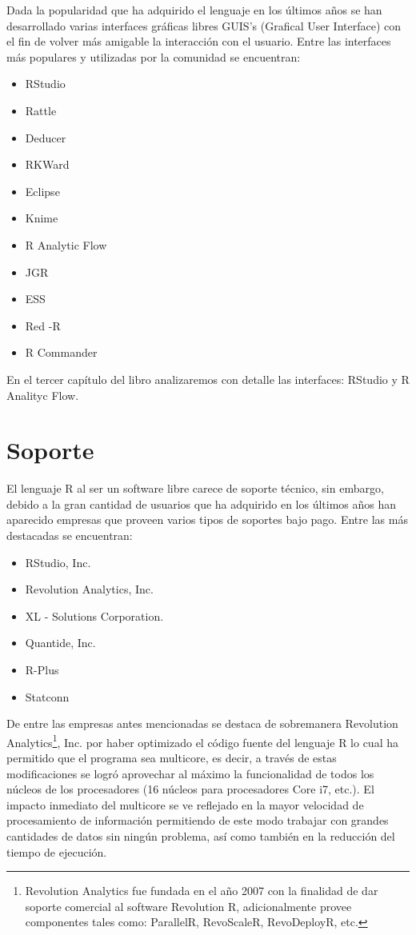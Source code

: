 \documentclass[11pt,a4paper,oneside]{book}\usepackage[]{graphicx}\usepackage[]{color}
\begin{document}
Dada la popularidad que ha adquirido el lenguaje en los últimos años se han desarrollado varias interfaces gráficas libres  GUIS's (Grafical User Interface) con el fin de volver más amigable la interacción con el usuario. Entre las interfaces más populares y utilizadas por la comunidad se encuentran:
\begin{multicols}{3}
\begin{itemize}
  \item RStudio
  \item Rattle
  \item Deducer
  \item RKWard
  \item Eclipse
  \item Knime
  \item R Analytic Flow
  \item JGR
  \item ESS
  \item Red -R
  \item R Commander
\end{itemize}
\end{multicols}

En el tercer capítulo del libro analizaremos con detalle las interfaces: RStudio y R Analityc Flow.

\section{Soporte}

El lenguaje R al ser un software libre carece de soporte técnico, sin embargo, debido a la gran cantidad de usuarios que ha adquirido en los últimos años han aparecido empresas que proveen varios tipos de soportes bajo pago. Entre las más destacadas se encuentran:
\begin{multicols}{2}
\begin{itemize}
  \item RStudio, Inc.
  \item Revolution Analytics, Inc.
  \item XL - Solutions Corporation.
  \item Quantide, Inc.
  \item R-Plus
  \item Statconn
\end{itemize}
\end{multicols}

De entre las empresas antes mencionadas se destaca de sobremanera Revolution Analytics\footnote{Revolution Analytics fue fundada en el año 2007 con la finalidad de dar soporte comercial al software Revolution R, adicionalmente provee componentes tales como: ParallelR, RevoScaleR, RevoDeployR, etc.}, Inc. por haber optimizado el código fuente del lenguaje R lo cual ha permitido que el programa sea multicore, es decir, a través de estas modificaciones se logró aprovechar al máximo la funcionalidad de todos los núcleos de los procesadores (16 núcleos para procesadores Core i7, etc.). El impacto inmediato del multicore se ve reflejado en la mayor velocidad de procesamiento de información permitiendo de este modo trabajar con grandes cantidades de datos sin ningún problema, así como también en la reducción del tiempo de ejecución.
\end{document}
